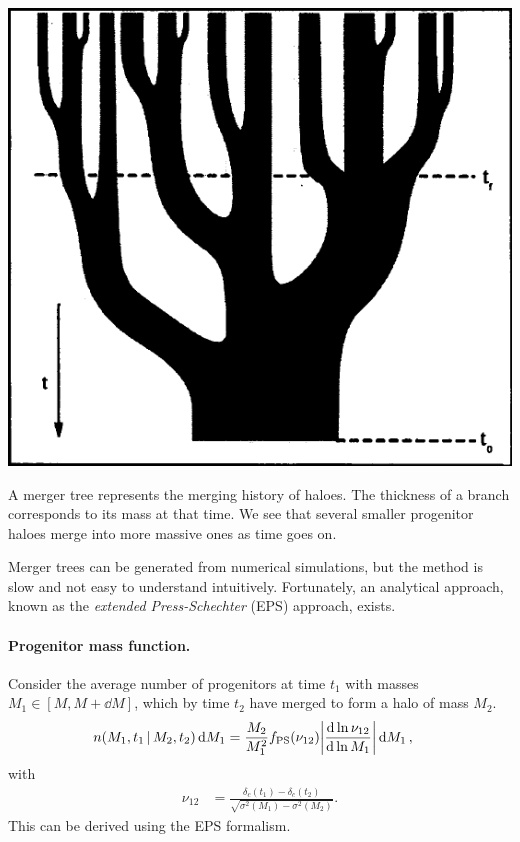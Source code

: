 \begin{marginfigure}
	\includegraphics[width=\textwidth]{img/ch-04/tree.pdf}
	\caption{A merger tree represents the merging history of haloes. The thickness of a branch corresponds to its mass at that time. We see that several smaller progenitor haloes merge into more massive ones as time goes on.}
	\label{fig:tree}
\end{marginfigure}

Merger trees can be generated from numerical simulations, but the method is slow and not easy to understand intuitively.
Fortunately, an analytical approach, known as the \emph{extended Press-Schechter} (EPS) approach, exists.

\paragraph*{Progenitor mass function.}
Consider the average number of progenitors at time $t_1$ with masses $M_1 \in [M, M + \dd{M}]$, which by time $t_2$ have merged to form a halo of mass $M_2$.
\begin{align*}
	n(M_1, t_1 \, | \, M_2, t_2) \dd{M_1}
	&= \frac{M_2}{M_1^2} f_\text{PS}(\nu_{12}) \abs*{\dv{\ln \nu_{12}}{\ln M_1}} \dd{M_1},
\end{align*}
with
\begin{align*}
	\nu_{12}
	&= \frac{\delta_c(t_1) - \delta_c(t_2)}{\sqrt{\sigma^2(M_1) - \sigma^2(M_2)}}.
\end{align*}
This can be derived using the \textsc{EPS} formalism.

